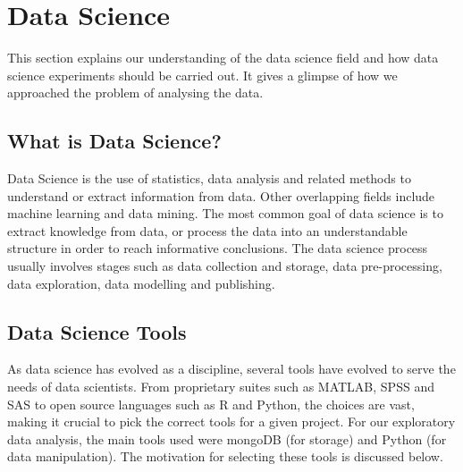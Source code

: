 \documentclass[fleqn,10pt]{SelfArx} %
\begin{document}

\section{Data Science}
This section explains our understanding of the data science field and how data science experiments should be carried out. It gives a glimpse of how we approached the problem of analysing the data.

	\subsection{What is Data Science?}
Data Science is the use of statistics, data analysis and related methods to understand or extract information from data. Other overlapping fields include machine learning and data mining. The most common goal of data science is to extract knowledge from data, or process the data into an understandable structure in order to reach informative conclusions. The data science process usually involves stages such as data collection and storage, data pre-processing, data exploration, data modelling and publishing. \\

	\subsection{Data Science Tools}
As data science has evolved as a discipline, several tools have evolved to serve the needs of data scientists. From proprietary suites such as MATLAB, SPSS and SAS to open source languages such as R and Python, the choices are vast, making it crucial to pick the correct tools for a given project. For our exploratory data analysis, the main tools used were mongoDB (for storage) and Python (for data manipulation). The motivation for selecting these tools is discussed below. \\
\end{document}
